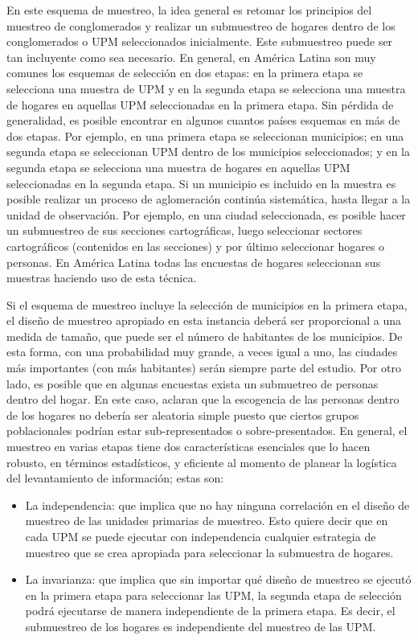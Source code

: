 En este esquema de muestreo, la idea general es retomar los principios del muestreo de conglomerados y realizar un submuestreo de hogares dentro de los conglomerados o UPM seleccionados inicialmente. Este submuestreo puede ser tan incluyente como sea necesario. En general, en América Latina son muy comunes los esquemas de selección en dos etapas: en la primera etapa se selecciona una muestra de UPM y en la segunda etapa se selecciona una muestra de hogares en aquellas UPM seleccionadas en la primera etapa. Sin pérdida de generalidad, es posible encontrar en algunos cuantos países esquemas en más de dos etapas. Por ejemplo, en una primera etapa se seleccionan municipios; en una segunda etapa se seleccionan UPM dentro de los municipios seleccionados; y en la segunda etapa se selecciona una muestra de hogares en aquellas UPM seleccionadas en la segunda etapa. Si un municipio es incluido en la muestra es posible realizar un proceso de aglomeración continúa sistemática, hasta llegar a la unidad de observación. Por ejemplo, en una ciudad seleccionada, es posible hacer un submuestreo de sus secciones cartográficas, luego seleccionar sectores cartográficos (contenidos en las secciones) y por último seleccionar hogares o personas. En América Latina todas las encuestas de hogares seleccionan sus muestras haciendo uso de esta técnica.

Si el esquema de muestreo incluye la selección de municipios en la primera etapa, el diseño de muestreo apropiado en esta instancia deberá ser proporcional a una medida de tamaño, que puede ser el número de habitantes de los municipios. De esta forma, con una probabilidad muy grande, a veces igual a uno, las ciudades más importantes (con más habitantes) serán siempre parte del estudio. Por otro lado, es posible que en algunas encuestas exista un submuetreo de personas dentro del hogar. En este caso, \citet{Clark_Steel_2007} aclaran que la escogencia de las personas dentro de los hogares no debería ser aleatoria simple puesto que ciertos grupos poblacionales podrían estar sub-representados o sobre-presentados. En general, el muestreo en varias etapas tiene dos características esenciales que lo hacen robusto, en términos estadísticos, y eficiente al momento de planear la logística del levantamiento de información; estas son:

\begin{itemize}
\tightlist
\item
  La independencia: que implica que no hay ninguna correlación en el diseño de muestreo de las unidades primarias de muestreo. Esto quiere decir que en cada UPM se puede ejecutar con independencia cualquier estrategia de muestreo que se crea apropiada para seleccionar la submuestra de hogares.
\item
  La invarianza: que implica que sin importar qué diseño de muestreo se ejecutó en la primera etapa para seleccionar las UPM, la segunda etapa de selección podrá ejecutarse de manera independiente de la primera etapa. Es decir, el submuestreo de los hogares es independiente del muestreo de las UPM.
\end{itemize}

